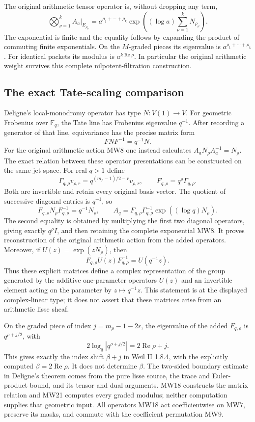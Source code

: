 \documentclass[11pt,a4paper]{article}
\begin{document}
The original arithmetic tensor operator is, without dropping any term,
\[
 \bigotimes_{\nu=1}^k A_a|_{E_{\rho_\nu}}
  =a^{\rho_1+\cdots+\rho_k}
     \exp\!\left((\log a)\sum_{\nu=1}^k N_{\rho_\nu}\right).
 \tag{MW16}
\]
The exponential is finite and the equality follows by expanding
the product of commuting finite exponentials. On the \(M\)-graded
pieces its eigenvalue is \(a^{\rho_1+\cdots+\rho_k}\).
For identical packets its modulus is \(a^{k\operatorname{Re}\rho}\).
In particular the original arithmetic weight survives this complete
nilpotent-filtration construction.

\subsection{The exact Tate-scaling comparison}

Deligne's local-monodromy operator has type \(N:V(1)\to V\).
For geometric Frobenius over \(\mathbb F_q\), the Tate line has
Frobenius eigenvalue \(q^{-1}\). After recording a generator of
that line, equivariance has the precise matrix form
\[
             FNF^{-1}=q^{-1}N .
 \tag{MW17}
\]
For the original arithmetic action MW8 one instead calculates
\(A_aN_\rho A_a^{-1}=N_\rho\). The exact relation between these
operator presentations can be constructed on the same jet space.
For real \(q>1\) define
\[
 \Gamma_{q,\rho}v_{\rho,r}
   =q^{(m_\rho-1)/2-r}v_{\rho,r},\qquad
 F_{q,\rho}=q^\rho\Gamma_{q,\rho}.
 \tag{MW18}
\]
Both are invertible and retain every original basis vector.
The quotient of successive diagonal entries is \(q^{-1}\), so
\[
 F_{q,\rho}N_\rho F_{q,\rho}^{-1}=q^{-1}N_\rho,\qquad
 A_q=F_{q,\rho}\Gamma_{q,\rho}^{-1}
                     \exp((\log q)N_\rho).
 \tag{MW19}
\]
The second equality is obtained by multiplying the first two
diagonal operators, giving exactly \(q^\rho I\), and then retaining
the complete exponential MW8. It proves reconstruction of the
original arithmetic action from the added operators.
Moreover, if \(U(z)=\exp(zN_\rho)\), then
\[
 F_{q,\rho}U(z)F_{q,\rho}^{-1}=U(q^{-1}z).
 \tag{MW20}
\]
Thus these explicit matrices define a complex representation of the
group generated by the additive one-parameter operators \(U(z)\)
and an invertible element acting on the parameter by \(z\mapsto
q^{-1}z\). This statement is at the displayed complex-linear
type; it does not assert that these matrices arise from an
arithmetic lisse sheaf.

On the graded piece of index \(j=m_\rho-1-2r\), the eigenvalue
of the added \(F_{q,\rho}\) is \(q^{\rho+j/2}\), with
\[
 2\log_q|q^{\rho+j/2}|=2\operatorname{Re}\rho+j .
 \tag{MW21}
\]
This gives exactly the index shift \(\beta+j\) in Weil II 1.8.4,
with the explicitly computed \(\beta=2\operatorname{Re}\rho\).
It does not determine \(\beta\). The two-sided boundary estimate in
Deligne's theorem comes from the pure lisse source, the trace and
Euler-product bound, and its tensor and dual arguments. MW18
constructs the matrix relation and MW21 computes every graded
modulus; neither computation supplies that geometric input.
All operators MW18 act coefficientwise on MW7, preserve its masks,
and commute with the coefficient permutation MW9.
\end{document}

